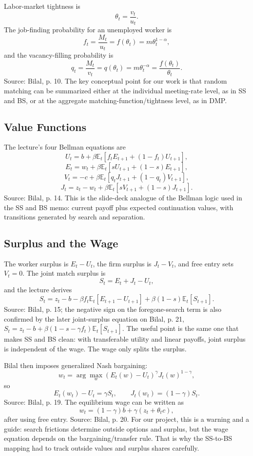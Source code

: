 \documentclass[11pt]{article}
\newcommand{\E}{\mathbb{E}}
\newcommand{\1}{\mathbf{1}}
\begin{document}
Labor-market tightness is
\[
\theta_t=\frac{v_t}{u_t}.
\]
The job-finding probability for an unemployed worker is
\[
f_t=\frac{M_t}{u_t}=f(\theta_t)=m\theta_t^{1-\alpha},
\]
and the vacancy-filling probability is
\[
q_t=\frac{M_t}{v_t}=q(\theta_t)=m\theta_t^{-\alpha}
=\frac{f(\theta_t)}{\theta_t}.
\]
Source: Bilal, p. 10. The key conceptual point for our work is that random
matching can be summarized either at the individual meeting-rate level, as in
SS and BS, or at the aggregate matching-function/tightness level, as in DMP.

\subsection{Value Functions}

The lecture's four Bellman equations are
\[
U_t=b+\beta \E_t\left[f_t E_{t+1}+(1-f_t)U_{t+1}\right],
\]
\[
E_t=w_t+\beta \E_t\left[sU_{t+1}+(1-s)E_{t+1}\right],
\]
\[
V_t=-c+\beta \E_t\left[q_tJ_{t+1}+(1-q_t)V_{t+1}\right],
\]
\[
J_t=z_t-w_t+\beta \E_t\left[sV_{t+1}+(1-s)J_{t+1}\right].
\]
Source: Bilal, p. 14. This is the slide-deck analogue of the Bellman logic used
in the SS and BS memo: current payoff plus expected continuation values, with
transitions generated by search and separation.

\subsection{Surplus and the Wage}

The worker surplus is $E_t-U_t$, the firm surplus is $J_t-V_t$, and free entry
sets $V_t=0$. The joint match surplus is
\[
S_t=E_t+J_t-U_t,
\]
and the lecture derives
\[
S_t
=
z_t-b-\beta f_t\E_t[E_{t+1}-U_{t+1}]
+\beta(1-s)\E_t[S_{t+1}].
\]
Source: Bilal, p. 15; the negative sign on the foregone-search term is also
confirmed by the later joint-surplus equation on Bilal, p. 21,
$S_t=z_t-b+\beta(1-s-\gamma f_t)\E_t[S_{t+1}]$. The useful point is the same
one that makes SS and BS clean: with transferable utility and linear payoffs,
joint surplus is independent of the wage. The wage only splits the surplus.

Bilal then imposes generalized Nash bargaining:
\[
w_t=\arg\max_w (E_t(w)-U_t)^\gamma J_t(w)^{1-\gamma},
\]
so
\[
E_t(w_t)-U_t=\gamma S_t,
\qquad
J_t(w_t)=(1-\gamma)S_t.
\]
Source: Bilal, p. 19. The equilibrium wage can be written as
\[
w_t=(1-\gamma)b+\gamma(z_t+\theta_t c),
\]
after using free entry. Source: Bilal, p. 20. For our project, this is a
warning and a guide: search frictions determine outside options and surplus,
but the wage equation depends on the bargaining/transfer rule. That is why the
SS-to-BS mapping had to track outside values and surplus shares carefully.
\end{document}
